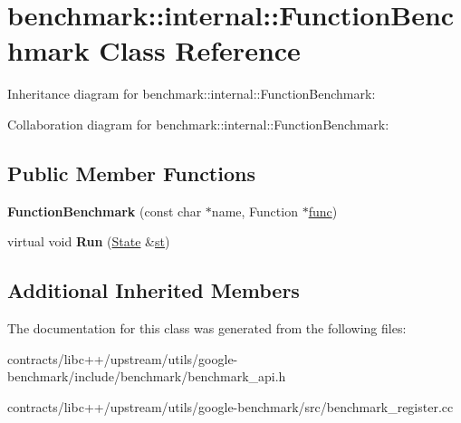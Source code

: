 \hypertarget{classbenchmark_1_1internal_1_1_function_benchmark}{}\section{benchmark\+:\+:internal\+:\+:Function\+Benchmark Class Reference}
\label{classbenchmark_1_1internal_1_1_function_benchmark}


Inheritance diagram for benchmark\+:\+:internal\+:\+:Function\+Benchmark\+:


Collaboration diagram for benchmark\+:\+:internal\+:\+:Function\+Benchmark\+:
\subsection*{Public Member Functions}
\begin{DoxyCompactItemize}
\item 
\mbox{\label{classbenchmark_1_1internal_1_1_function_benchmark_ad5fd6bc24428640e8370a2a1b7da95cc}} 
{\bfseries Function\+Benchmark} (const char $\ast$name, Function $\ast$\mbox{\hyperlink{structfunc}{func}})
\item 
\mbox{\label{classbenchmark_1_1internal_1_1_function_benchmark_ae13237bc9b61488c65309389cf80e8ad}} 
virtual void {\bfseries Run} (\mbox{\hyperlink{classbenchmark_1_1_state}{State}} \&\mbox{\hyperlink{structst}{st}})
\end{DoxyCompactItemize}
\subsection*{Additional Inherited Members}


The documentation for this class was generated from the following files\+:\begin{DoxyCompactItemize}
\item 
contracts/libc++/upstream/utils/google-\/benchmark/include/benchmark/benchmark\+\_\+api.\+h\item 
contracts/libc++/upstream/utils/google-\/benchmark/src/benchmark\+\_\+register.\+cc\end{DoxyCompactItemize}
